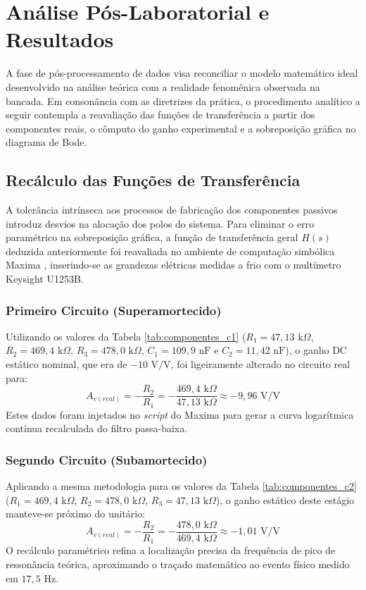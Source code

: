 \chapter{Análise Pós-Laboratorial e Resultados}

A fase de pós-processamento de dados visa reconciliar o modelo matemático ideal desenvolvido na análise teórica com a realidade fenomênica observada na bancada. Em consonância com as diretrizes da prática, o procedimento analítico a seguir contempla a reavaliação das funções de transferência a partir dos componentes reais, o cômputo do ganho experimental e a sobreposição gráfica no diagrama de Bode.

\section{Recálculo das Funções de Transferência}

A tolerância intrínseca aos processos de fabricação dos componentes passivos introduz desvios na alocação dos polos do sistema. Para eliminar o erro paramétrico na sobreposição gráfica, a função de transferência geral $H(s)$ deduzida anteriormente foi reavaliada no ambiente de computação simbólica Maxima \cite{maxima}, inserindo-se as grandezas elétricas medidas a frio com o multímetro Keysight U1253B.

\subsection{Primeiro Circuito (Superamortecido)}

Utilizando os valores da Tabela \ref{tab:componentes_c1} ($R_1 = 47,13\text{ k}\Omega$, $R_2 = 469,4\text{ k}\Omega$, $R_3 = 478,0\text{ k}\Omega$, $C_1 = 109,9\text{ nF}$ e $C_2 = 11,42\text{ nF}$), o ganho DC estático nominal, que era de $-10\text{ V/V}$, foi ligeiramente alterado no circuito real para:
\begin{equation}
	A_{v(real)} = -\frac{R_2}{R_1} = -\frac{469,4\text{ k}\Omega}{47,13\text{ k}\Omega} \approx -9,96 \text{ V/V}
\end{equation}
Estes dados foram injetados no \textit{script} do Maxima para gerar a curva logarítmica contínua recalculada do filtro passa-baixa.

\subsection{Segundo Circuito (Subamortecido)}

Aplicando a mesma metodologia para os valores da Tabela \ref{tab:componentes_c2} ($R_1 = 469,4\text{ k}\Omega$, $R_2 = 478,0\text{ k}\Omega$, $R_3 = 47,13\text{ k}\Omega$), o ganho estático deste estágio manteve-se próximo do unitário:
\begin{equation}
	A_{v(real)} = -\frac{R_2}{R_1} = -\frac{478,0\text{ k}\Omega}{469,4\text{ k}\Omega} \approx -1,01 \text{ V/V}
\end{equation}
O recálculo paramétrico refina a localização precisa da frequência de pico de ressonância teórica, aproximando o traçado matemático ao evento físico medido em $17,5\text{ Hz}$.


